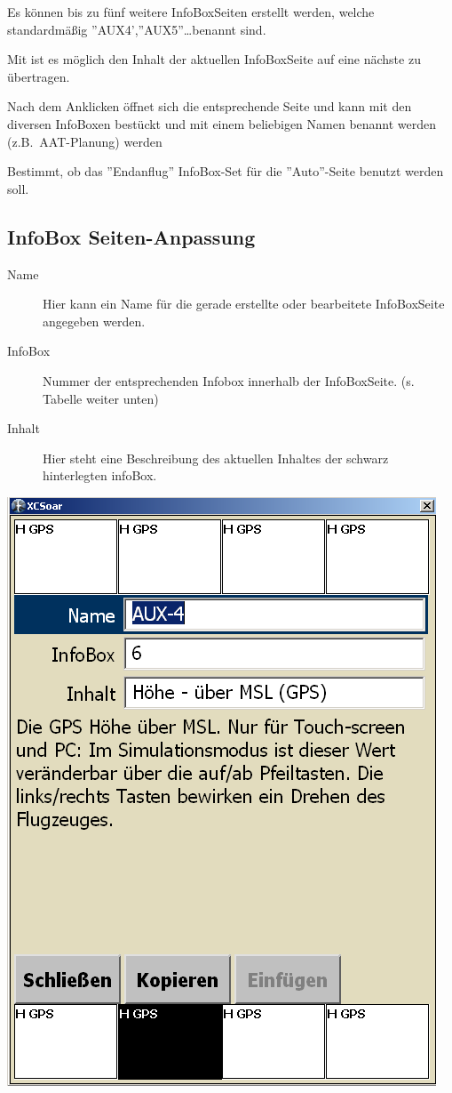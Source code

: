 Es können bis zu fünf weitere InfoBoxSeiten erstellt werden, welche
standardmäßig ''AUX4',''AUX5''\dots benannt sind.

Mit  ist es möglich den Inhalt der aktuellen InfoBoxSeite auf eine nächste zu übertragen.

Nach dem Anklicken öffnet sich die entsprechende Seite und kann mit den diversen InfoBoxen bestückt
und mit einem beliebigen Namen benannt werden (z.B.\ AAT-Planung) werden

  Bestimmt, ob das ''Endanflug'' InfoBox-Set für die
 ''Auto''-Seite benutzt werden soll.
%
\subsection*{InfoBox Seiten-Anpassung}
%
\begin{description}
\item[Name]  Hier kann ein Name für die gerade erstellte oder bearbeitete InfoBoxSeite angegeben werden.
\item[InfoBox]  Nummer der entsprechenden Infobox innerhalb der InfoBoxSeite. (s. Tabelle weiter unten)
\item[Inhalt]  Hier steht eine Beschreibung des aktuellen Inhaltes der schwarz hinterlegten infoBox.
\end{description}


\begin{center}
\includegraphics[angle=0,width=0.65\linewidth,keepaspectratio='true']{figures/Creating-New-InfoBoxSeite.png}
\end{center}


